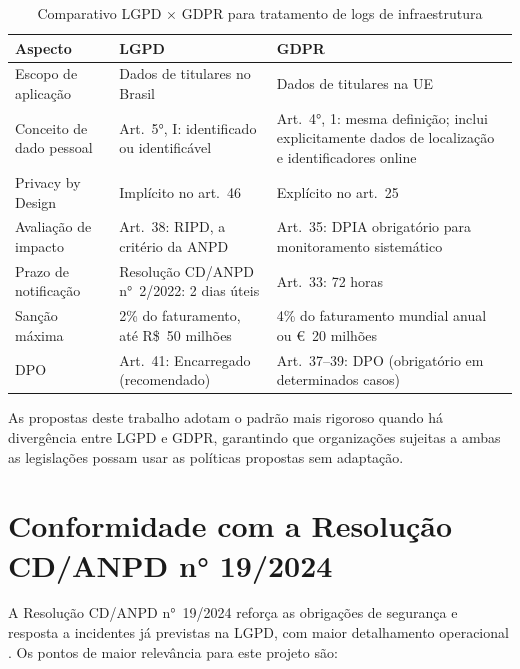 \begin{table}[htb]
    \ABNTEXfontereduzida
    \caption{Comparativo LGPD × GDPR para tratamento de logs de infraestrutura}
    \label{tab:lgpd-gdpr}
    \begin{tabular}{p{3.5cm}p{5cm}p{5cm}}
        \toprule
        \textbf{Aspecto} & \textbf{LGPD} & \textbf{GDPR} \\
        \midrule
        Escopo de aplicação & Dados de titulares no Brasil & Dados de titulares na UE \\
        Conceito de dado pessoal & Art.\ 5°, I: identificado ou identificável & Art.\ 4°, 1: mesma definição; inclui explicitamente dados de localização e identificadores online \\
        Privacy by Design & Implícito no art.\ 46 & Explícito no art.\ 25 \\
        Avaliação de impacto & Art.\ 38: RIPD, a critério da ANPD & Art.\ 35: DPIA obrigatório para monitoramento sistemático \\
        Prazo de notificação & Resolução CD/ANPD n°~2/2022: 2 dias úteis & Art.\ 33: 72 horas \\
        Sanção máxima & 2\% do faturamento, até R\$~50 milhões & 4\% do faturamento mundial anual ou €~20 milhões \\
        DPO & Art.\ 41: Encarregado (recomendado) & Art.\ 37--39: DPO (obrigatório em determinados casos) \\
        \bottomrule
    \end{tabular}
\end{table}

As propostas deste trabalho adotam o padrão mais rigoroso quando há divergência entre LGPD e GDPR, garantindo que organizações sujeitas a ambas as legislações possam usar as políticas propostas sem adaptação.

\section{Conformidade com a Resolução CD/ANPD n° 19/2024}
\label{sec:conformidade-anpd}

A Resolução CD/ANPD n°~19/2024 reforça as obrigações de segurança e resposta a incidentes já previstas na LGPD, com maior detalhamento operacional \cite{anpd2024resolucao}. Os pontos de maior relevância para este projeto são:

